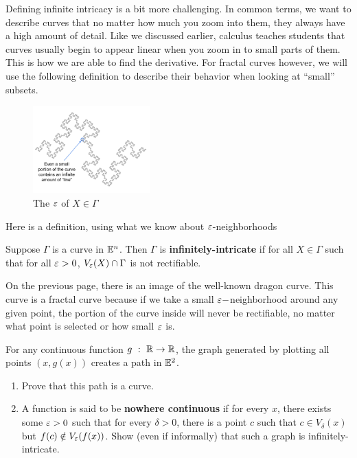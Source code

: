 Defining infinite intricacy is a bit more challenging. In common terms, we want to describe curves that no matter how much you zoom into them, they always have a high amount of detail. Like we discussed earlier, calculus teaches students that curves usually begin to appear linear when you zoom in to small parts of them. This is how we are able to find the derivative. For fractal curves however, we will use the following definition to describe their behavior when looking at ``small'' subsets.\par 

\begin{figure}
  \begin{center}
    \includegraphics[width=0.4\textwidth]{Images/1.1.3.png}
  \end{center}
  \caption{The $\varepsilon$ \parneighborhood of $X\in\Gamma$}
\end{figure}

Here is a definition, using what we know about $\varepsilon$-neighborhoods\par

\begin{definition}
    Suppose $\Gamma$ is a curve in $\mathbb{E}^n$. Then $\Gamma$ is \textbf{infinitely-intricate} if for all $X\in\Gamma$ such that for all $\varepsilon>0$, $V_\varepsilon(X)\cap \Gamma$ is not rectifiable.
\end{definition}

\clearpage

On the previous page, there is an image of the well-known dragon curve. This curve is a fractal curve because if we take a small $\varepsilon-$neighborhood around any given point, the portion of the curve inside will never be rectifiable, no matter what point is selected or how small $\varepsilon$ is.\par

\begin{exercise}
    For any continuous function $g\ :\ \R\to\R$, the graph generated by plotting all points $(x,g(x))$ creates a path in $\mathbb{E}^2$. 
    \begin{enumerate}
        \item Prove that this path is a curve.
        \item A function is said to be \textbf{nowhere continuous} if for every $x$, there exists some $\varepsilon>0$ such that for every $\delta>0$, there is a point $c$ such that $c\in V_\delta(x)$ but $ f(c)\notin V_\varepsilon(f(x))$. Show (even if informally) that such a graph is infinitely-intricate.
    \end{enumerate}
\end{exercise}



